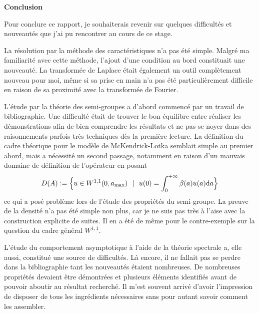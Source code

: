 
\vspace*{1cm}

\begin{center}
    \Large\textbf{Conclusion}
\end{center}

Pour conclure ce rapport, je souhaiterais revenir sur quelques difficultés et nouveautés que j'ai pu rencontrer au cours de ce stage.

La résolution par la méthode des caractéristiques n'a pas été simple. Malgré ma familiarité avec cette méthode, l'ajout d'une condition au bord constituait une nouveauté. La transformée de Laplace était également un outil complètement nouveau pour moi, même si sa prise en main n'a pas été particulièrement difficile en raison de sa proximité avec la transformée de Fourier.

L'étude par la théorie des semi-groupes a d'abord commencé par un travail de bibliographie. Une difficulté était de trouver le bon équilibre entre réaliser les démonstrations afin de bien comprendre les résultats et ne pas se noyer dans des raisonnements parfois très techniques dès la première lecture. La définition du cadre théorique pour le modèle de McKendrick-Lotka semblait simple au premier abord, mais a nécessité un second passage, notamment en raison d'un mauvais domaine de définition de l'opérateur en posant
\begin{equation*}
    D(A) := \Big\{ u \in W^{1,1}(0,a_{\max}) \ \ | \ \ u(0) = \int_0^{+\infty}\beta(a)u(a)\d a \Big\}
\end{equation*}
ce qui a posé problème lors de l'étude des propriétés du semi-groupe. La preuve de la densité n'a pas été simple non plus, car je ne suis pas très à l'aise avec la construction explicite de suites. Il en a été de même pour le contre-exemple sur la question du cadre général $W^{1,1}$.

L'étude du comportement asymptotique à l'aide de la théorie spectrale a, elle aussi, constitué une source de difficultés. Là encore, il ne fallait pas se perdre dans la bibliographie tant les nouveautés étaient nombreuses. De nombreuses propriétés devaient être démontrées et plusieurs éléments identifiés avant de pouvoir aboutir au résultat recherché. Il m'est souvent arrivé d'avoir l'impression de disposer de tous les ingrédients nécessaires sans pour autant savoir comment les assembler.

